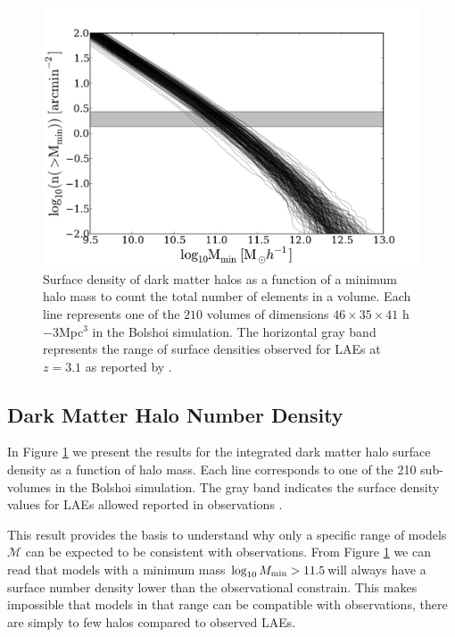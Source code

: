 \documentclass[usenatbib]{mn2e}
\newcommand{\hMsun}{{\ifmmode{h^{-1}{\rm
        {M_{\odot}}}}\else{$h^{-1}{\rm{M_{\odot}}}$}\fi}}
\begin{document}
\begin{figure}
\begin{center}
\includegraphics[width=1.10\linewidth,angle=0]{./plots/Fig1.pdf}
\caption{ \label{fig:halos} Surface density of dark
  matter halos as a function of a minimum halo mass to count the
  total number of elements in a volume. Each line represents one of the
  $210$ volumes of dimensions $46\times 35\times 41$ h${-3}$Mpc$^{3}$
  in the Bolshoi simulation. The horizontal gray band represents the
  range of surface densities observed for LAEs at $z=3.1$ as reported
  by \citep{Yamada2012}.}
\end{center} 
\end{figure}


\subsection{Dark Matter Halo Number Density}

In Figure \ref{fig:halos} we present the results for  the
integrated dark matter halo surface density as a function of halo
mass. Each line corresponds to one of the 210 sub-volumes in the
Bolshoi simulation. The gray band indicates the surface density
values for LAEs allowed reported in observations \citep{Yamada2012}.
 
This result provides the basis to understand why only a specific range of models
${\mathcal M}$ can be expected to be consistent with
observations. From Figure \ref{fig:halos} we can read that models with
a minimum mass $\log_{10} M_{\rm min}>11.5$\hMsun will always have a
surface number density lower than the observational
constrain. This makes impossible that models in that range can be
compatible with observations, there are simply to few halos compared
to observed LAEs.
\end{document}
